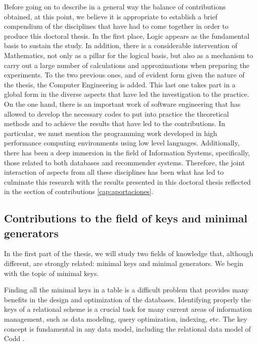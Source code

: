 Before going on to describe in a general way the balance of contributions obtained, at this point, we believe it is appropriate to establish a brief compendium of the disciplines that have had to come together in order to produce this doctoral thesis. In the first place, Logic appears as the fundamental basis to sustain the study. In addition, there is a considerable intervention of Mathematics, not only as a pillar for the logical basis, but also as a mechanism to carry out a large number of calculations and approximations when preparing the experiments. To the two previous ones, and of evident form given the nature of the thesis, the Computer Engineering is added. This last one takes part in a global form in the diverse aspects that have led the investigation to the practice. On the one hand, there is an important work of software engineering that has allowed to develop the necessary codes to put into practice the theoretical methods and to achieve the results that have led to the contributions. In particular, we must mention the programming work developed in high performance computing environments using low level languages. Additionally, there has been a deep immersion in the field of Information Systems, specifically, those related to both databases and recommender systems. Therefore, the joint interaction of aspects from all these disciplines has been what has led to culminate this research with the results presented in this doctoral thesis reflected in the section of contributions \ref{cap:aportaciones}.


\subsection*{Contributions to the field of keys and minimal generators}
In the first part of the thesis, we will study two fields of knowledge that, although different, are strongly related: minimal keys and minimal generators. We begin with the topic of minimal keys.

\vspace{0.3cm}

Finding all the minimal keys in a table is a difficult problem that provides many benefits in the design and optimization of the databases. Identifying properly the keys of a relational scheme is a crucial task for many current areas of information management, such as data modeling, query optimization, indexing, etc. The key concept is fundamental in any data model, including the relational data model of Codd \cite{Codd1970}.


